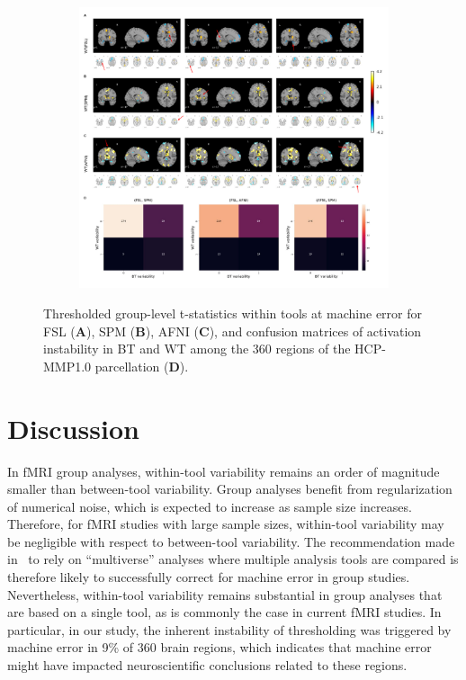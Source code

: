 \documentclass[11pt,onecolumn]{article}
\begin{document}
\begin{figure}[ht]
  \begin{subfigure}[ht]{\textwidth}
    \centering
    \includegraphics[width=\textwidth]{figures/act_deact-marked.pdf}
  \end{subfigure}
  \centering
  \caption{Thresholded group-level t-statistics within tools at machine error for FSL (\textbf{A}),
    SPM (\textbf{B}), AFNI (\textbf{C}), and confusion matrices of activation instability
    in BT and WT among the 360 regions of the HCP-MMP1.0 parcellation (\textbf{D}).}
  \label{fig:thresh-maps}
\end{figure}


\section{Discussion}

In fMRI group analyses, within-tool variability remains an order of magnitude smaller
than between-tool variability. Group analyses benefit from regularization
of numerical noise, which is expected to increase as sample size
increases. Therefore, for fMRI studies with large sample sizes, within-tool variability may be negligible with respect to between-tool variability. The
recommendation made in~\cite{botvinik2020variability} to rely on
``multiverse'' analyses where multiple analysis tools are compared is
therefore likely to successfully correct for machine error in group
studies. Nevertheless, within-tool variability remains substantial in group analyses
that are based on a single tool, as is commonly the case in current fMRI
studies. In particular, in our study, the inherent instability of
thresholding was triggered by machine error in 9\% of 360 brain regions,
which indicates that machine error might have impacted neuroscientific
conclusions related to these regions.
\end{document}
